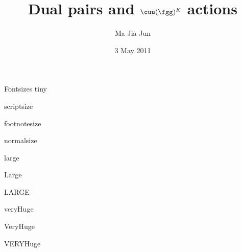 \documentclass[final]{beamer} %
\title[$\cuu(\fgg)^K$ actions]{Dual pairs and $\cuu(\fgg)^K$ actions}
\author[Ma]{Ma Jia Jun}
\institute[NUS]{National University of Singapore}
\date{3 May 2011}
\begin{document}
  \begin{frame}{} 
    \vfill
    \begin{block}{\large Fontsizes}
      \centering
      {\tiny tiny}\par
      {\scriptsize scriptsize}\par
      {\footnotesize footnotesize}\par
      {\normalsize normalsize}\par
      {\large large}\par
      {\Large Large}\par
      {\LARGE LARGE}\par
      {\veryHuge veryHuge}\par
      {\VeryHuge VeryHuge}\par
      {\VERYHuge VERYHuge}\par
    \end{block}
    \vfill
  \end{frame}
  
\end{document}

